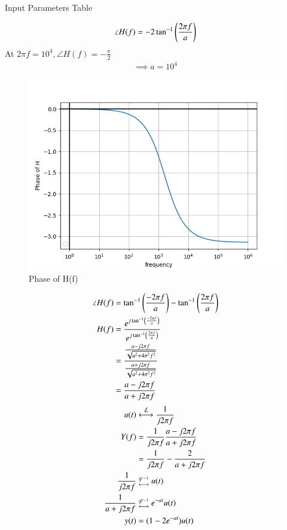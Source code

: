 \documentclass[journal,12pt,twocolumn]{IEEEtran}
\theoremstyle{remark}
\begin{document}
\solution 
\begin{table}[!h]
    \centering
    
    \caption{Input Parameters Table}
\end{table}
\begin{align}
    \angle {H(f)} = -2 \tan^{-1}\left(\frac{2\pi f}{a}\right)
\end{align}
At $2\pi f = 10^4, \angle{H(f)} = -\frac{\pi}{2}$
\begin{align}
    \implies a = 10^4 
\end{align}
\begin{figure}[!h]
    \centering
    \includegraphics[width=\columnwidth]{figs/phase.png}
    \caption{Phase of H(f)}
\end{figure}
\begin{align}
    \angle {H(f)} &= \tan^{-1}\left(\frac{-2\pi f}{a}\right) - \tan^{-1}\left(\frac{2\pi f}{a}\right)\\
    H(f) &= \frac{e^{j\tan^{-1}\left(\frac{-2\pi f}{a}\right)}}{e^{j\tan^{-1}\left(\frac{2\pi f}{a}\right)}}\\
    &= \frac{\frac{a - j2\pi f}{\sqrt{a^2 + 4\pi^2 f^2}}}{\frac{a + j2\pi f}{\sqrt{a^2 + 4\pi^2 f^2}}}\\
    &= \frac{a - j2\pi f}{a + j2\pi f}
\end{align}
\begin{align}
    u(t) &\system{\mathcal{L}} \frac{1}{j2\pi f}\\
    Y(f) &= \frac{1}{j2\pi f} \frac{a - j2\pi f}{a + j2\pi f}\\
    &= \frac{1}{j2\pi f} - \frac{2}{a + j2\pi f}\\
    \frac{1}{j2\pi f} &\mathrel{\substack{\mathcal{F}^{-1}\\\longleftrightarrow}} u(t)\\
    \frac{1}{a + j2\pi f} &\mathrel{\substack{\mathcal{F}^{-1}\\\longleftrightarrow}} e^{-at} u(t) \\
    y(t) &= (1-2e^{-at}) u(t)
\end{align}
\end{document}
